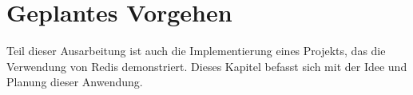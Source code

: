 
\chapter{Geplantes Vorgehen}

Teil dieser Ausarbeitung ist auch die Implementierung eines Projekts, das die Verwendung von \acs{Redis} demonstriert. Dieses Kapitel befasst sich mit der Idee und Planung dieser Anwendung. 